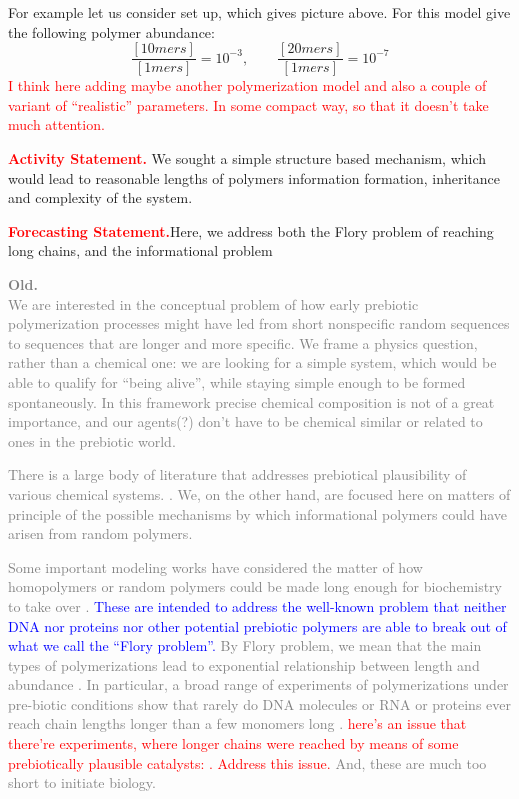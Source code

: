 \documentclass[12pt]{paper}
\newcommand{\pq}[1]{\left[ #1 \right]}
\newcommand{\red}[1]{\textcolor{red}{#1}}
\newcommand{\blue}[1]{\textcolor{blue}{#1}}
\newcommand{\gray}[1]{\textcolor{gray}{#1}}
\begin{document}
For example let us consider set up, which gives picture above. For this model give the following 
polymer abundance:
\begin{equation}
  \frac{\pq{10mers}}{\pq{1mers}}=10^{-3},\qquad\frac{\pq{20mers}}{\pq{1mers}}=10^{-7}
\end{equation} 
\red{I think here adding maybe another polymerization model and also a couple of variant of 
  ``realistic'' parameters. In some compact way, so that it doesn't take much attention.}

\noindent\red{\textbf{Activity Statement.}} We sought a simple structure based mechanism, which 
would lead to reasonable lengths of polymers information formation, inheritance and complexity of 
the system.

\noindent\red{\textbf{Forecasting Statement.}}Here, we address both the Flory problem of reaching 
long chains, and the informational problem

\gray{\textbf{Old.}\\
We are interested in the conceptual problem of how early prebiotic polymerization processes 
might have led from short nonspecific random sequences to sequences that are longer and more specific.  
We frame a physics question, rather than a chemical one:  we are looking for a simple system, 
which would be able to qualify for ``being alive'',  while staying simple enough to be formed 
spontaneously. In this framework precise chemical composition is not of a great importance, and 
our agents(?) don't have to be chemical similar or related to ones in the prebiotic world.}

\gray{
There is a large body of literature that addresses prebiotical plausibility of various chemical 
systems. \cite{Orgel,}.  
We, on the other hand, are focused here on matters of principle of the possible mechanisms 
by which informational polymers could have arisen from random polymers.  
}

\gray{
Some important modeling works have considered the matter of how homopolymers or random 
polymers could be made long enough for biochemistry to take over \cite{}.  
\blue{These are intended to address the well-known problem that neither DNA \cite{} nor proteins 
  \cite{} nor other potential prebiotic polymers \cite{} are able to break out of what we call the 
  ``Flory problem''. }
By Flory problem, we mean that the main types of polymerizations lead to exponential relationship
between length and abundance \cite{Flory1953,??}.  In particular, a broad range of experiments 
of  polymerizations under pre-biotic conditions show that rarely do DNA molecules or RNA 
or proteins ever reach chain lengths longer than a few monomers long \cite{}. 
 \red{here's an issue that there're experiments, where longer chains were reached by means
   of some prebiotically plausible catalysts: \cite{}. Address this issue.}
And, these are much too short to initiate biology. 
}
\end{document}
